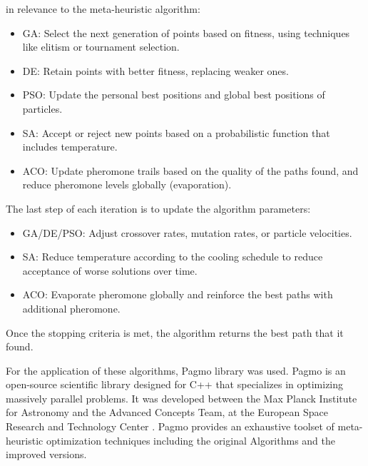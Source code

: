 in relevance to the meta-heuristic algorithm: 
\begin{itemize}
    \item GA: Select the next generation of points based on fitness, using techniques like elitism or tournament selection.
    \item DE: Retain points with better fitness, replacing weaker ones.
    \item PSO: Update the personal best positions and global best positions of particles.
    \item SA: Accept or reject new points based on a probabilistic function that includes temperature.
    \item ACO: Update pheromone trails based on the quality of the paths found, and reduce pheromone levels globally (evaporation).
\end{itemize}
The last step of each iteration is to update the algorithm parameters:
\begin{itemize}
    \item GA/DE/PSO: Adjust crossover rates, mutation rates, or particle velocities.
    \item SA: Reduce temperature according to the cooling schedule to reduce acceptance of worse solutions over time.
    \item ACO: Evaporate pheromone globally and reinforce the best paths with additional pheromone.
\end{itemize}
Once the stopping criteria is met, the algorithm returns the best path that it found.

For the application of these algorithms, Pagmo library was used. Pagmo is an open-source scientific library designed for 
C++ that specializes in optimizing massively parallel problems. It was developed between the Max Planck Institute for 
Astronomy and the Advanced Concepts Team, at the European Space Research and Technology Center \cite{R45}.
Pagmo provides an exhaustive toolset of meta-heuristic optimization techniques including the original Algorithms
and the improved versions. 



